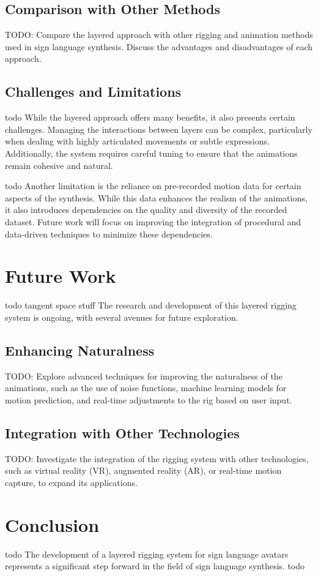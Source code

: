 \documentclass[../../main.tex]{subfiles}
\begin{document}
\subsection{Comparison with Other Methods}
TODO: Compare the layered approach with other rigging and animation methods used in sign language synthesis. Discuss the advantages and disadvantages of each approach.

\subsection{Challenges and Limitations}
todo While the layered approach offers many benefits, it also presents certain challenges. Managing the interactions between layers can be complex, particularly when dealing with highly articulated movements or subtle expressions. Additionally, the system requires careful tuning to ensure that the animations remain cohesive and natural.

todo Another limitation is the reliance on pre-recorded motion data for certain aspects of the synthesis. While this data enhances the realism of the animations, it also introduces dependencies on the quality and diversity of the recorded dataset. Future work will focus on improving the integration of procedural and data-driven techniques to minimize these dependencies.

\section{Future Work}
todo tangent space stuff The research and development of this layered rigging system is ongoing, with several avenues for future exploration.

\subsection{Enhancing Naturalness}
TODO: Explore advanced techniques for improving the naturalness of the animations, such as the use of noise functions, machine learning models for motion prediction, and real-time adjustments to the rig based on user input.

\subsection{Integration with Other Technologies}
TODO: Investigate the integration of the rigging system with other technologies, such as virtual reality (VR), augmented reality (AR), or real-time motion capture, to expand its applications.

\section{Conclusion}
todo The development of a layered rigging system for sign language avatars represents a significant step forward in the field of sign language synthesis. todo
\end{document}

